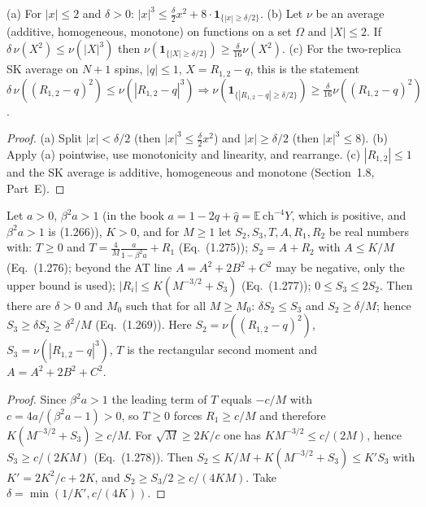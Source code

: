 \begin{lemma}
\label{lem:sg-tal:indicator-lower-bound}
  \leanok
{}
(a) For $|x|\le2$ and $\delta>0$: $|x|^3\le\frac\delta2x^2+8\cdot\mathbf 1_{\{|x|\ge\delta/2\}}$.
(b) Let $\nu$ be an average (additive, homogeneous, monotone) on functions on a set $\Omega$ and $|X|\le2$.
If $\delta\,\nu(X^2)\le\nu(|X|^3)$ then $\nu(\mathbf 1_{\{|X|\ge\delta/2\}})\ge\frac\delta{16}\nu(X^2)$.
(c) For the two-replica SK average on $N+1$ spins, $|q|\le1$, $X=R_{1,2}-q$, this is the statement
$\delta\,\nu((R_{1,2}-q)^2)\le\nu(|R_{1,2}-q|^3)\Rightarrow\nu(\mathbf 1_{\{|R_{1,2}-q|\ge\delta/2\}})\ge\frac\delta{16}\nu((R_{1,2}-q)^2)$.
\end{lemma}
\begin{proof}
  \leanok
(a) Split $|x|<\delta/2$ (then $|x|^3\le\frac\delta2x^2$) and $|x|\ge\delta/2$ (then $|x|^3\le8$).  (b) Apply (a) pointwise,
use monotonicity and linearity, and rearrange.  (c) $|R_{1,2}|\le1$ and the SK average is additive, homogeneous and
monotone (Section~1.8, Part~E).
\end{proof}

\begin{theorem}
\label{thm:sg-tal:beyond-at-deduction}
  \leanok
{}
Let $a>0$, $\beta^2a>1$ (in the book $a=1-2q+\hat q=\mathbb E\,\mathrm{ch}^{-4}Y$, which is positive, and $\beta^2a>1$ is (1.266)),
$K>0$, and for $M\ge1$ let $S_2,S_3,T,A,R_1,R_2$ be real numbers with:
$T\ge0$ and $T=\frac4M\frac a{1-\beta^2a}+R_1$ (Eq.~(1.275)); $S_2=A+R_2$ with $A\le K/M$ (Eq.~(1.276); beyond the AT line $A=A^2+2B^2+C^2$ may be negative, only the upper bound is used);
$|R_i|\le K(M^{-3/2}+S_3)$ (Eq.~(1.277)); $0\le S_3\le2S_2$.
Then there are $\delta>0$ and $M_0$ such that for all $M\ge M_0$: $\delta S_2\le S_3$ and $S_2\ge\delta/M$; hence
$S_3\ge\delta S_2\ge\delta^2/M$ (Eq.~(1.269)).  Here $S_2=\nu((R_{1,2}-q)^2)$, $S_3=\nu(|R_{1,2}-q|^3)$, $T$ is the
rectangular second moment and $A=A^2+2B^2+C^2$.
\end{theorem}
\begin{proof}
  \leanok
Since $\beta^2a>1$ the leading term of $T$ equals $-c/M$ with $c=4a/(\beta^2a-1)>0$, so $T\ge0$ forces
$R_1\ge c/M$ and therefore $K(M^{-3/2}+S_3)\ge c/M$.  For $\sqrt M\ge2K/c$ one has $KM^{-3/2}\le c/(2M)$, hence
$S_3\ge c/(2KM)$ (Eq.~(1.278)).  Then $S_2\le K/M+K(M^{-3/2}+S_3)\le K'S_3$ with $K'=2K^2/c+2K$, and
$S_2\ge S_3/2\ge c/(4KM)$.  Take $\delta=\min(1/K',c/(4K))$.
\end{proof}

